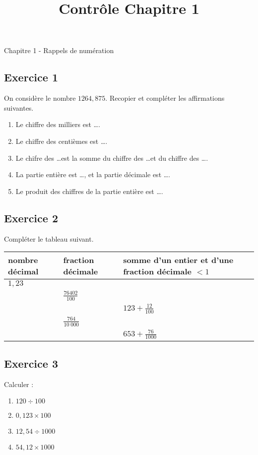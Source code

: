 \documentclass[12 pt]{extarticle}
\title{Contrôle Chapitre 1}
\date{}
\theoremstyle{plain}
\begin{document}
\begin{center}{\Large Chapitre 1 - Rappels de  numération}\\ 
 \end{center}
 
 \subsection*{Exercice 1}
On considère le nombre $1264,875$. Recopier et compléter les affirmations suivantes. 
 \begin{enumerate}
 \item Le chiffre des milliers est \ldots.
 \item Le chiffre des centièmes est \ldots. 
 \item Le chifre des \ldots est la somme du chiffre des \ldots et du chiffre des \ldots. 
 \item La partie entière est \ldots, et la partie décimale est \ldots. 
 \item Le produit des chiffres de la partie entière est \ldots. 
 \end{enumerate}

\subsection*{Exercice 2}

Compléter le tableau suivant. 

\renewcommand{\arraystretch}{2}
\begin{tabular}[height = 15 pt]{|l|l|l|l|}
\hline 
nombre décimal & fraction décimale  & somme d'un entier et d'une fraction décimale $<1$\\ \hline
$1,23$ &  &  \\
\hline 
 &  $\displaystyle\frac{76402}{100}$ &  \\
\hline 
 &  & $\displaystyle123 + \frac{12}{100}$   \\
\hline 
 &  $\displaystyle\frac{764}{10\ 000}$ &  \\
\hline 
 &  & $\displaystyle653 + \frac{76}{1000}$   \\
\hline
\end{tabular}

\subsection*{Exercice 3}

Calculer : \begin{enumerate}
\item $120 \div 100$
\item $0,123 \times 100$
\item $12, 54 \div 1000$
\item $ 54,12 \times 1000$
\end{enumerate}
\end{document}
